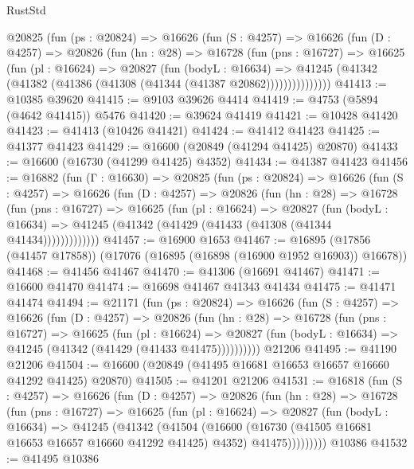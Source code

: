 \begin{lexlean}{RustStd}
\begin{coremodule}
      @20825
        (fun (ps : @20824) =>
        @16626
          (fun (S : @4257) =>
          @16626
            (fun (D : @4257) =>
            @20826
              (fun (hn : @28) =>
              @16728
                (fun (pns : @16727) =>
                @16625
                  (fun (pl : @16624) =>
                  @20827
                    (fun (bodyL : @16634) =>
                    @41245 (@41342 (@41382 (@41386 (@41308 (@41344 (@41387 @20862)))))))))))))))
@41413 := @10385 @39620
@41415 := @9103 @39626 @4414
@41419 := @4753 (@5894 (@4642 @41415)) @5476
@41420 := @39624 @41419
@41421 := @10428 @41420
@41423 := @41413 (@10426 @41421)
@41424 := @41412 @41423
@41425 := @41377 @41423
@41429 := @16600 (@20849 (@41294 @41425) @20870)
@41433 := @16600 (@16730 (@41299 @41425) @4352)
@41434 := @41387 @41423
@41456 := @16882
    (fun (Γ : @16630) =>
    @20825
      (fun (ps : @20824) =>
      @16626
        (fun (S : @4257) =>
        @16626
          (fun (D : @4257) =>
          @20826
            (fun (hn : @28) =>
            @16728
              (fun (pns : @16727) =>
              @16625
                (fun (pl : @16624) =>
                @20827
                  (fun (bodyL : @16634) =>
                  @41245 (@41342 (@41429 (@41433 (@41308 (@41344 @41434)))))))))))))
@41457 := @16900 @1653
@41467 := @16895 (@17856 (@41457 @17858)) (@17076 (@16895 (@16898 (@16900 @1952 @16903)) @16678))
@41468 := @41456 @41467
@41470 := @41306 (@16691 @41467)
@41471 := @16600 @41470
@41474 := @16698 @41467 @41343 @41434
@41475 := @41471 @41474
@41494 := @21171
    (fun (ps : @20824) =>
    @16626
      (fun (S : @4257) =>
      @16626
        (fun (D : @4257) =>
        @20826
          (fun (hn : @28) =>
          @16728
            (fun (pns : @16727) =>
            @16625
              (fun (pl : @16624) =>
              @20827 (fun (bodyL : @16634) => @41245 (@41342 (@41429 (@41433 @41475))))))))))
    @21206
@41495 := @41190 @21206
@41504 := @16600 (@20849 (@41495 @16681 @16653 @16657 @16660 @41292 @41425) @20870)
@41505 := @41201 @21206
@41531 := @16818
    (fun (S : @4257) =>
    @16626
      (fun (D : @4257) =>
      @20826
        (fun (hn : @28) =>
        @16728
          (fun (pns : @16727) =>
          @16625
            (fun (pl : @16624) =>
            @20827
              (fun (bodyL : @16634) =>
              @41245
                (@41342
                  (@41504
                    (@16600
                      (@16730 (@41505 @16681 @16653 @16657 @16660 @41292 @41425) @4352)
                      @41475)))))))))
    @10386
@41532 := @41495 @10386

\end{coremodule}
\end{lexlean}
